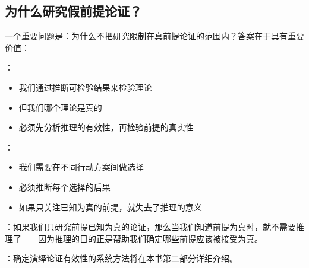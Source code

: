 \subsection{为什么研究假前提论证？}

一个重要问题是：为什么不把研究限制在真前提论证的范围内？答案在于具有重要价值：

\begin{examplebox}[title=研究假前提论证的重要性]
：
\begin{itemize}
  \item 我们通过推断可检验结果来检验理论
  \item 但我们哪个理论是真的
  \item 必须先分析推理的有效性，再检验前提的真实性
\end{itemize}

：
\begin{itemize}
  \item 我们需要在不同行动方案间做选择
  \item 必须推断每个选择的后果
  \item 如果只关注已知为真的前提，就失去了推理的意义
\end{itemize}
\end{examplebox}

：如果我们只研究前提已知为真的论证，那么当我们知道前提为真时，就不需要推理了——因为推理的目的正是帮助我们确定哪些前提应该被接受为真。

：确定演绎论证有效性的系统方法将在本书第二部分详细介绍。

